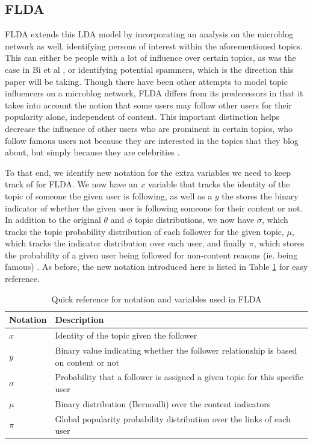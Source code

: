 \documentclass[a4paper]{article}
\begin{document}
\subsection{FLDA}
FLDA extends this LDA model by incorporating an analysis on the microblog network as well, identifying persons of interest within the aforementioned topics. This can either be people with a lot of influence over certain topics, as was the case in Bi et al \cite{flda}, or identifying potential spammers, which is the direction this paper will be taking. Though there have been other attempts to model topic influencers on a microblog network, FLDA differs from its predecessors in that it takes into account the notion that some users may follow other users for their popularity alone, independent of content. This important distinction helps decrease the influence of other users who are prominent in certain topics, who follow famous users not because they are interested in the topics that they blog about, but simply because they are celebrities \cite{flda}.

To that end, we identify new notation for the extra variables we need to keep track of for FLDA. We now have an $x$ variable that tracks the identity of the topic of someone the given user is following, as well as a $y$ the stores the binary indicator of whether the given user is following someone for their content or not. In addition to the original $\theta$ and $\phi$ topic distributions, we now have $\sigma$, which tracks the topic probability distribution of each follower for the given topic, $\mu$, which tracks the indicator distribution over each user, and finally $\pi$, which stores the probability of a given user being followed for non-content reasons (ie. being famous) \cite{flda}. As before, the new notation introduced here is listed in Table \ref{tab:fldavars} for easy reference.

\begin{table}[h]
  \centering %
  \begin{tabular}{ |l|l| }
    \hline
    Notation & Description \\
    \hline
    \hline
    $x$ & Identity of the topic given the follower \\
    $y$ & Binary value indicating whether the follower relationship is based on content or not \\
    $\sigma$ & Probability that a follower is assigned a given topic for this specific user \\
    $\mu$ & Binary distribution (Bernoulli) over the content indicators \\
    $\pi$ & Global popularity probability distribution over the links of each user \\
    \hline
  \end{tabular}
  \caption{Quick reference for notation and variables used in FLDA}
  \label{tab:fldavars}
\end{table}
\end{document}
